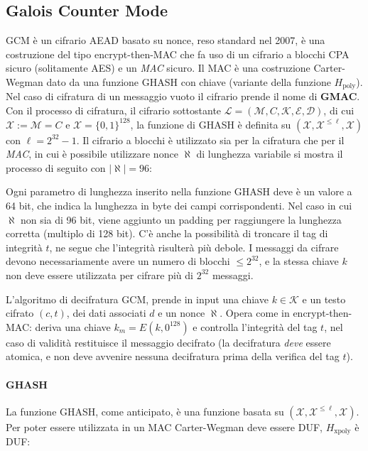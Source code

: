 \subsection{Galois Counter Mode}
GCM è un cifrario AEAD basato su nonce, reso standard nel 2007, è una costruzione del tipo encrypt-then-MAC che fa uso di un cifrario a blocchi CPA sicuro (solitamente AES) e un \emph{MAC} sicuro. Il MAC è una costruzione Carter-Wegman dato da una funzione GHASH con chiave (variante della funzione $H_{\text{poly}}$). Nel caso di cifratura di un messaggio vuoto il cifrario prende il nome di \textbf{GMAC}. Con il processo di cifratura, il cifrario sottostante $\mathcal{L} = (\mathcal{M},C,\mathcal{K},\mathcal{E},\mathcal{D})$, di cui $\mathcal{X} := \mathcal{M} = C$ e $\mathcal{X} = \{0,1\}^{128}$, la funzione di GHASH è definita su $(\mathcal{X},\mathcal{X}^{\leq \ell},\mathcal{X})$ con $\ell = 2^{32} - 1$. Il cifrario a blocchi è utilizzato sia per la cifratura che per il \emph{MAC},  in cui è possibile utilizzare nonce $\aleph$ di lunghezza variabile si mostra il processo di seguito con $|\aleph| = 96$:


Ogni parametro di lunghezza inserito nella funzione GHASH deve è un valore a 64 bit, che indica la lunghezza in byte dei campi corrispondenti. Nel caso in cui $\aleph$ non sia di 96 bit, viene aggiunto un padding per raggiungere la lunghezza corretta (multiplo di 128 bit). C'è anche la possibilità di troncare il tag di integrità $t$, ne segue che l'integrità risulterà più debole. I messaggi da cifrare devono necessariamente avere un numero di blocchi $\leq 2^{32}$, e la stessa chiave $k$ non deve essere utilizzata per cifrare più di $2^{32}$ messaggi. 

\vspace{1em}
L'algoritmo di decifratura GCM, prende in input una chiave $k \in \mathcal{K}$ e un testo cifrato $(c,t)$, dei dati associati $d$ e un nonce $\aleph$. Opera come in encrypt-then-MAC: deriva una chiave $k_{m} = E(k,0^{128})$ e controlla l'integrità del tag $t$, nel caso di validità restituisce il messaggio decifrato (la decifratura \emph{deve} essere atomica, e non deve avvenire nessuna decifratura prima della verifica del tag $t$).

\paragraph{GHASH} 
La funzione GHASH, come anticipato, è una funzione basata su $(\mathcal{X},\mathcal{X}^{\leq \ell},\mathcal{X})$. Per poter essere utilizzata in un MAC Carter-Wegman deve essere DUF, $H_{\text{xpoly}}$ è DUF:

